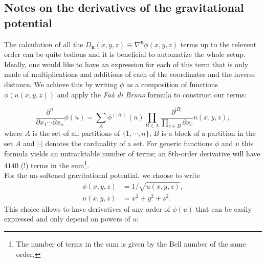 \subsection{Notes on the derivatives of the gravitational potential}
\label{ssec:grav_derivatives}

The calculation of all the
$D_\mathbf{n}(x,y,z) \equiv \nabla^{\mathbf{n}}\phi(x,y,z)$ terms up
to the relevent order can be quite tedious and it is beneficial to
automatize the whole setup. Ideally, one would like to have an
expression for each of this term that is only made of multiplications
and additions of each of the coordinates and the inverse distance. We
achieve this by writing $\phi$ as a composition of functions
$\phi(u(x,y,z))$ and apply the \textit{Fa\`a di Bruno}
formula \citep[i.e. the ``chain rule'' for higher order derivatives,
 see e.g.][]{Hardy2006} to construct our terms:

\begin{equation}
\label{eq:faa_di_bruno}
\frac{\partial^n}{\partial x_1 \cdots \partial x_n} \phi(u)
= \sum_{A} \phi^{(|A|)}(u) \prod_{B \in
A} \frac{\partial^{|B|}}{\prod_{c\in B}\partial x_c} u(x,y,z),
\end{equation}
where $A$ is the set of all partitions of $\lbrace1,\cdots, n\rbrace$,
$B$ is a block of a partition in the set $A$ and $|\cdot|$ denotes the
cardinality of a set. For generic functions $\phi$ and $u$ this
formula yields an untracktable number of terms; an 8th-order
derivative will have $4140$ (!)  terms in the sum\footnote{The number
  of terms in the sum is given by the Bell number of the same
  order.}. \\ For the un-softened gravitational potential, we choose to write
\begin{align}
   \phi(x,y,z) &= 1 / \sqrt{u(x,y,z)}, \\
   u(x,y,z) &= x^2 + y^2 + z^2.
\end{align}
This choice allows to have derivatives of any order of $\phi(u)$ that
can be easily expressed and only depend on powers of $u$:

